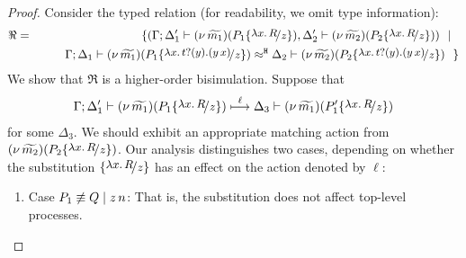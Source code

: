 \begin{proof}
	Consider the typed relation (for readability, we omit type information):
	\begin{eqnarray*}
		\Re	&=&	\set{
					(\Gamma; \Delta_1' \proves \newsp{\widetilde{m_1}}{P_1 \subst{{\abs{x}{R}}}{z}}, \Delta_2' \proves \newsp{\widetilde{m_2}}{P_2 \subst{{\abs{x}{R}}}{z}})
					\setbar\\
			&&		\qquad \horel{\Gamma}{\Delta_1}{\newsp{\widetilde{m_1}}{P_1 \subst{\trvalx{t}}{z} }}
					{\hwb}
					{\Delta_2}{\newsp{\widetilde{m_2}}{P_2 \subst{\trvalx{t}}{z} }}~~}
	\end{eqnarray*}
	We show that $\Re$ is a higher-order bisimulation. Suppose that 
	\begin{eqnarray}
		\horel{\Gamma}{\Delta_1'}{\newsp{\widetilde{m_1}}{P_1 \subst{{\abs{x}{R}}}{z} }}
		{\hby{\ell}}
		{\Delta_3}{\newsp{\widetilde{m_1}}{P_1' \subst{{\abs{x}{R}}}{z} }}
		\label{lem:proc_subst1}
	\end{eqnarray}
	for some $\Delta_3$.
   We should exhibit an appropriate matching action from $ \newsp{\widetilde{m_2}}{P_2 \subst{{\abs{x}{R}}}{z}}$.
	Our analysis distinguishes two cases, depending on whether the
	substitution $\subst{{\abs{x}{R}}}{z}$ has an effect on the action denoted by $\ell$:
	\begin{enumerate}
		\item	Case $P_1 \not\equiv Q \;|\; z\, {n}$: That is,
				the substitution does not affect top-level processes. 


\end{enumerate}
\end{proof}
